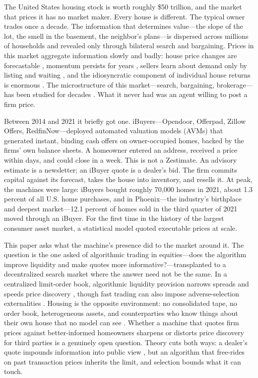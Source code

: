 \documentclass[12pt, letterpaper]{article}
\theoremstyle{remark}
\begin{document}
The United States housing stock is worth roughly \$50 trillion, and the market that prices it has no market maker. Every house is different. The typical owner trades once a decade. The information that determines value---the slope of the lot, the smell in the basement, the neighbor's plans---is dispersed across millions of households and revealed only through bilateral search and bargaining. Prices in this market aggregate information slowly and badly: house price changes are forecastable \citep{case1989efficiency}, momentum persists for years \citep{guren2018momentum, glaeser2017extrapolative}, sellers learn about demand only by listing and waiting \citep{anenberg2016information}, and the idiosyncratic component of individual house returns is enormous \citep{giacoletti2021idiosyncratic}. The microstructure of this market---search, bargaining, brokerage---has been studied for decades \citep{wheaton1990vacancy, krainer2001theory, genesove2012search, han2015microstructure}. What it never had was an agent willing to post a firm price.

Between 2014 and 2021 it briefly got one. iBuyers---Opendoor, Offerpad, Zillow Offers, RedfinNow---deployed automated valuation models (AVMs) that generated instant, binding cash offers on owner-occupied homes, backed by the firms' own balance sheets. A homeowner entered an address, received a price within days, and could close in a week. This is not a Zestimate. An advisory estimate is a newsletter; an iBuyer quote is a dealer's bid. The firm commits capital against its forecast, takes the house into inventory, and resells it. At peak, the machines were large: iBuyers bought roughly 70{,}000 homes in 2021, about 1.3 percent of all U.S. home purchases, and in Phoenix---the industry's birthplace and deepest market---12.1 percent of homes sold in the third quarter of 2021 moved through an iBuyer. For the first time in the history of the largest consumer asset market, a statistical model quoted executable prices at scale.

This paper asks what the machine's presence did to the market around it. The question is the one \citet{hendershott2011algorithmic} asked of algorithmic trading in equities---does the algorithm improve liquidity and make quotes more informative?---transplanted to a decentralized search market where the answer need not be the same. In a centralized limit-order book, algorithmic liquidity provision narrows spreads and speeds price discovery \citep{hendershott2011algorithmic, brogaard2014hft}, though fast trading can also impose adverse-selection externalities \citep{biais2015fast}. Housing is the opposite environment: no consolidated tape, no order book, heterogeneous assets, and counterparties who know things about their own house that no model can see \citep{kurlat2015testing, stroebel2016asymmetric}. Whether a machine that quotes firm prices against better-informed homeowners sharpens or distorts price discovery for third parties is a genuinely open question. Theory cuts both ways: a dealer's quote impounds information into public view \citep{glosten1985bid, kyle1985continuous}, but an algorithm that free-rides on past transaction prices inherits the \citet{grossman1980impossibility} limit, and \citet{akerlof1970lemons} selection bounds what it can touch.
\end{document}
